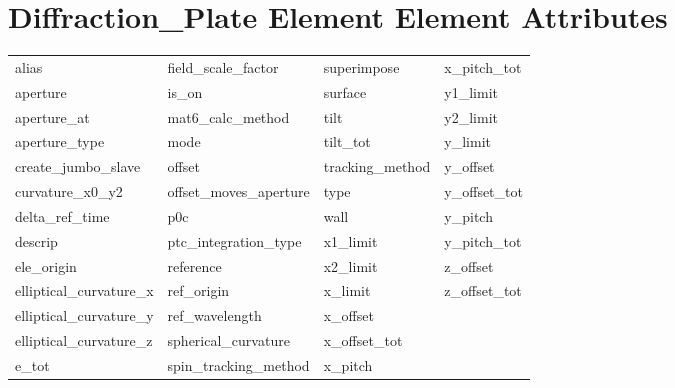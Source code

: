  \section{Diffraction_Plate Element Element Attributes}
 \label{s:list.diffraction.plate}
 
 \begin{tabular}{llll} \toprule
alias                       & field_scale_factor          & superimpose                 & x_pitch_tot                 \\
aperture                    & is_on                       & surface                     & y1_limit                    \\
aperture_at                 & mat6_calc_method            & tilt                        & y2_limit                    \\
aperture_type               & mode                        & tilt_tot                    & y_limit                     \\
create_jumbo_slave          & offset                      & tracking_method             & y_offset                    \\
curvature_x0_y2             & offset_moves_aperture       & type                        & y_offset_tot                \\
delta_ref_time              & p0c                         & wall                        & y_pitch                     \\
descrip                     & ptc_integration_type        & x1_limit                    & y_pitch_tot                 \\
ele_origin                  & reference                   & x2_limit                    & z_offset                    \\
elliptical_curvature_x      & ref_origin                  & x_limit                     & z_offset_tot                \\
elliptical_curvature_y      & ref_wavelength              & x_offset                    &                             \\
elliptical_curvature_z      & spherical_curvature         & x_offset_tot                &                             \\
e_tot                       & spin_tracking_method        & x_pitch                     &                             \\
 \bottomrule
 \end{tabular}
 \vfill
 
